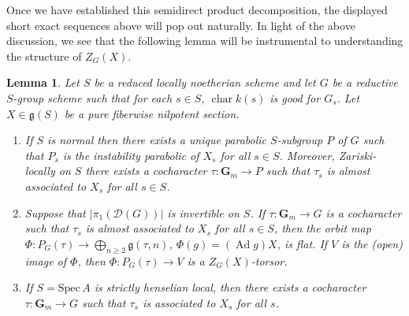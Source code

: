 \documentclass[11pt,reqno]{amsart}
\newtheorem{lemma}[theorem]{Lemma}
\theoremstyle{definition}
\newcommand{\Spec}{\mathrm{Spec} \,}
\newcommand{\bG}{{\mathbf G}}
\newcommand{\sD}{{\mathscr D}}
\newcommand{\fg}{\mathfrak{g}}
\DeclareMathOperator{\Ad}{Ad}
\DeclareMathOperator{\chara}{char}
\begin{document}
Once we have established this semidirect product decomposition, the displayed short exact sequences above will pop out naturally. In light of the above discussion, we see that the following lemma will be instrumental to understanding the structure of $Z_G(X)$.

\begin{lemma}\label{lemma:flat-pure-centralizer-consequences}
Let $S$ be a reduced locally noetherian scheme and let $G$ be a reductive $S$-group scheme such that for each $s \in S$, $\chara k(s)$ is good for $G_s$. Let $X \in \fg(S)$ be a pure fiberwise nilpotent section. 
\begin{enumerate}
    \item\label{item:instability-parabolic-exists-integrally} If $S$ is normal then there exists a unique parabolic $S$-subgroup $P$ of $G$ such that $P_s$ is the instability parabolic of $X_s$ for all $s \in S$. Moreover, Zariski-locally on $S$ there exists a cocharacter $\tau: \bG_m \to P$ such that $\tau_s$ is almost associated to $X_s$ for all $s \in S$.
    \item\label{item:orbit-map-is-flat} Suppose that $|\pi_1(\sD(G))|$ is invertible on $S$. If $\tau: \bG_m \to G$ is a cocharacter such that $\tau_s$ is almost associated to $X_s$ for all $s \in S$, then the orbit map $\Phi: P_G(\tau) \to \bigoplus_{n \geq 2} \fg(\tau, n)$, $\Phi(g) = (\Ad g) X$, is flat. If $V$ is the (open) image of $\Phi$, then $\Phi: P_G(\tau) \to V$ is a $Z_G(X)$-torsor.
    \item\label{item:associated-characters-exist-integrally} If $S = \Spec A$ is strictly henselian local, then there exists a cocharacter $\tau: \bG_m \to G$ such that $\tau_s$ is associated to $X_s$ for all $s$.
\end{enumerate} 
\end{lemma}
\end{document}
